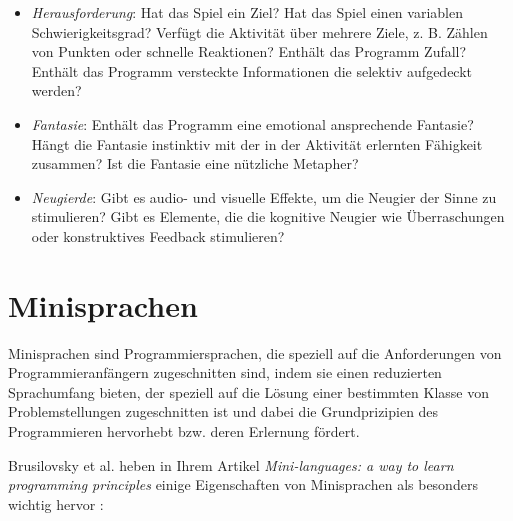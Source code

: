 \begin{itemize}
    \item \emph{Herausforderung}: Hat das Spiel ein Ziel? Hat das Spiel einen variablen Schwierigkeitsgrad? Verfügt die Aktivität über mehrere Ziele, z. B. Zählen von Punkten oder schnelle Reaktionen? Enthält das Programm Zufall? Enthält das Programm versteckte Informationen die selektiv aufgedeckt werden?
    \item \emph{Fantasie}: Enthält das Programm eine emotional ansprechende Fantasie? Hängt die Fantasie instinktiv mit der in der Aktivität erlernten Fähigkeit zusammen? Ist die Fantasie eine nützliche Metapher?
    \item \emph{Neugierde}: Gibt es audio- und visuelle Effekte, um die Neugier der Sinne zu stimulieren? Gibt es Elemente, die die kognitive Neugier wie Überraschungen oder konstruktives Feedback stimulieren?
\end{itemize}


\section{Minisprachen}
\label{sec:basics:mini-languages}

Minisprachen sind Programmiersprachen, die speziell auf die Anforderungen von Programmieranfängern zugeschnitten sind, indem sie einen reduzierten Sprachumfang bieten, der speziell auf die Lösung einer bestimmten Klasse von Problemstellungen zugeschnitten ist und dabei die Grundprizipien des Programmieren hervorhebt bzw. deren Erlernung fördert.

Brusilovsky et al. heben in Ihrem Artikel \textit{Mini-languages: a way to learn programming principles} einige Eigenschaften von Minisprachen als besonders wichtig hervor \cite[73-74]{brusilovsky1997}:

